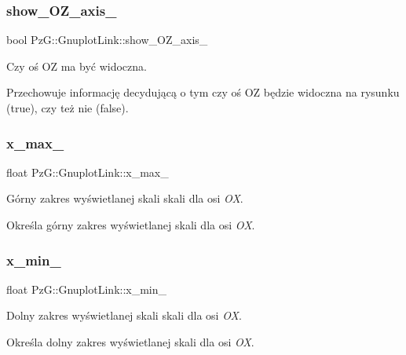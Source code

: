 \subsubsection{\texorpdfstring{show\+\_\+\+O\+Z\+\_\+axis\+\_\+}{show\_OZ\_axis\_}}
{\footnotesize\ttfamily bool Pz\+G\+::\+Gnuplot\+Link\+::show\+\_\+\+O\+Z\+\_\+axis\+\_\+\hspace{0.3cm}{\ttfamily [protected]}}



Czy oś OZ ma być widoczna. 

Przechowuje informację decydującą o tym czy oś OZ będzie widoczna na rysunku ({\ttfamily true}), czy też nie ({\ttfamily false}). \mbox{\label{class_pz_g_1_1_gnuplot_link_a1f8870f0cc643c5ef931b30b40b5e282}} 
\subsubsection{\texorpdfstring{x\+\_\+max\+\_\+}{x\_max\_}}
{\footnotesize\ttfamily float Pz\+G\+::\+Gnuplot\+Link\+::x\+\_\+max\+\_\+\hspace{0.3cm}{\ttfamily [protected]}}



Górny zakres wyświetlanej skali skali dla osi {\itshape OX}. 

Określa górny zakres wyświetlanej skali dla osi {\itshape OX}. \mbox{\label{class_pz_g_1_1_gnuplot_link_a9ca081e311914fb07ee4c292b8090247}} 
\subsubsection{\texorpdfstring{x\+\_\+min\+\_\+}{x\_min\_}}
{\footnotesize\ttfamily float Pz\+G\+::\+Gnuplot\+Link\+::x\+\_\+min\+\_\+\hspace{0.3cm}{\ttfamily [protected]}}



Dolny zakres wyświetlanej skali skali dla osi {\itshape OX}. 

Określa dolny zakres wyświetlanej skali dla osi {\itshape OX}. \mbox{\label{class_pz_g_1_1_gnuplot_link_ae105dcd466bbc10f0b70ed753e0c2e4e}} 
